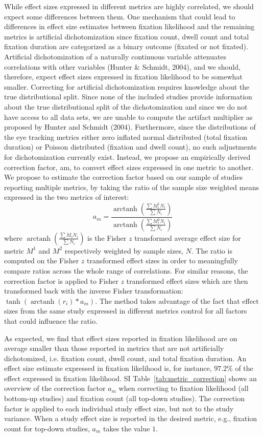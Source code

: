\documentclass{article}
\DeclareMathOperator\arctanh{arctanh}
\begin{document}
While effect sizes expressed in different metrics are highly correlated, we should expect some differences between them. One mechanism that could lead to differences in effect size estimates between fixation likelihood and the remaining metrics is artificial dichotomization since fixation count, dwell count and total fixation duration are categorized as a binary outcome (fixated or not fixated). Artificial dichotomization of a naturally continuous variable attenuates correlations with other variables (Hunter \& Schmidt, 2004), and we should, therefore, expect effect sizes expressed in fixation likelihood to be somewhat smaller. Correcting for artificial dichotomization requires knowledge about the true distributional split. Since none of the included studies provide information about the true distributional split of the dichotomization and since we do not have access to all data sets, we are unable to compute the artifact multiplier as proposed by Hunter and Schmidt (2004). Furthermore, since the distributions of the eye tracking metrics either zero inflated normal distributed (total fixation duration) or Poisson distributed (fixation and dwell count), no such adjustments for dichotomization currently exist. Instead, we propose an empirically derived correction factor, am, to convert effect sizes expressed in one metric to another. We propose to estimate the correction factor based on our sample of studies reporting multiple metrics, by taking the ratio of the sample size weighted means expressed in the two metrics of interest:
%
\begin{equation}
\label{eq:metrics_correction}
a_m = \frac{\arctanh \left( \frac{\sum M_i^1 N_i}{\sum N_i} \right)}{\arctanh \left( \frac{\sum M_i^2 N_i}{\sum N_i} \right)}
\end{equation}
%
where $\arctanh \left( \frac{\sum M_i N_i}{\sum N_i} \right)$ is the Fisher $z$ transformed average effect size for metric $M^1$ and $M^2$ respectively weighted by sample sizes, $N$. The ratio is computed on the Fisher $z$ transformed effect sizes in order to meaningfully compare ratios across the whole range of correlations. For similar reasons, the correction factor is applied to Fisher $z$ transformed effect sizes which are then transformed back with the inverse Fisher transformation: $\tanh(\arctanh(r_i)*a_m)$. The method takes advantage of the fact that effect sizes from the same study expressed in different metrics control for all factors that could influence the ratio.    

As expected, we find that effect sizes reported in fixation likelihood are on average smaller than those reported in metrics that are not artificially dichotomized, i.e. fixation count, dwell count, and total fixation duration. An effect size estimate expressed in fixation likelihood is, for instance, $97.2\%$ of the effect expressed in fixation likelihood. SI Table~\ref{tab:metric_correction} shows an overview of the correction factor $a_m$ when correcting to fixation likelihood (all bottom-up studies) and fixation count (all top-down studies). The correction factor is applied to each individual study effect size, but not to the study variance. When a study effect size is reported in the desired metric, e.g., fixation count for top-down studies, $a_m$ takes the value $1$.  
\end{document}
